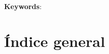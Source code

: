 \documentclass[11pt,twoside,spanish]{report} %
\begin{document}
\textbf{Keywords}:



\newpage
\chapter*{\'Indice general} %

\vspace*{-4cm}
\tableofcontents
\thispagestyle{empty}
\vspace*{-5cm}

%
\cleardoublepage

\thispagestyle{plain}
\pagestyle{plain}
\setcounter{page}{1}
\chapter{}

%
\section{}





\appendix
\chapter{}
\label{appendix:}

\section{}
\end{document}
